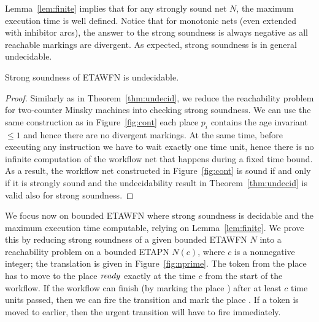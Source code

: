 Lemma~\ref{lem:finite} implies that 
for any strongly sound net $N$, the maximum execution
time is well defined.
Notice that for monotonic nets (even extended
with inhibitor arcs), the answer to the strong soundness is always
negative as all reachable markings are divergent. As expected,
strong soundness is in general undecidable.

\begin{theorem} \label{thm:strong-undecid}
Strong soundness of ETAWFN %
is undecidable.
\end{theorem}

\begin{proof}
Similarly as in Theorem~\ref{thm:undecid},
we reduce the reachability problem for
two-counter Minsky machines into checking strong soundness. We can use
the same construction as in Figure~\ref{fig:cont} each place
$p_i$ contains the age invariant $\leq 1$ and hence there are no divergent
markings. At the same time, before executing any instruction we have to
wait exactly one time unit, hence there is no infinite computation of the
workflow net that happens during a fixed time bound. As a result,
the workflow net constructed in Figure~\ref{fig:cont} is sound if and only
if it is strongly sound and the undecidability result in 
Theorem~\ref{thm:undecid} is valid also for strong soundness.
\end{proof}

We focus now on bounded ETAWFN where
strong soundness is decidable and the maximum execution 
time computable, relying on Lemma~\ref{lem:finite}. 
We prove this by reducing strong soundness of a given bounded ETAWFN $N$
into a reachability problem on a bounded ETAPN $N(c)$, 
where $c$ is a nonnegative integer; the translation
is given in Figure~\ref{fig:nprime}. 
The token from the place  has to move to the place ${\mathit{ready}}$
exactly at the time $c$ from the start of the workflow.
If the workflow can finish (by marking the place )
after at least $c$ time units passed, then we can fire the transition
 and mark the place . If %
a token is moved to  earlier, then the urgent transition
 will have to fire immediately.

